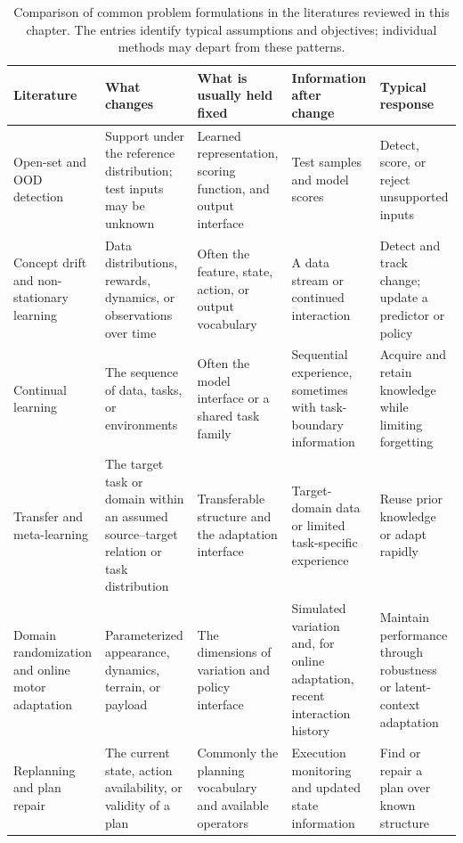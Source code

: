 \begin{table}[t]
\centering
\caption[Comparison of related problem formulations]{Comparison of common problem formulations in the literatures reviewed in this chapter. The entries identify typical assumptions and objectives; individual methods may depart from these patterns.}
\label{tab:landscape}
\scriptsize
\setlength{\tabcolsep}{3pt}
\renewcommand{\arraystretch}{1.22}
\begin{tabularx}{\textwidth}{>{\raggedright\arraybackslash}p{} *{4}{>{\raggedright\arraybackslash}X}}
\toprule
\textbf{Literature} & \textbf{What changes} & \textbf{What is usually held fixed} & \textbf{Information after change} & \textbf{Typical response} \\
\midrule
Open-set and OOD detection
& Support under the reference distribution; test inputs may be unknown
& Learned representation, scoring function, and output interface
& Test samples and model scores
& Detect, score, or reject unsupported inputs \\

Concept drift and non-stationary learning
& Data distributions, rewards, dynamics, or observations over time
& Often the feature, state, action, or output vocabulary
& A data stream or continued interaction
& Detect and track change; update a predictor or policy \\

Continual learning
& The sequence of data, tasks, or environments
& Often the model interface or a shared task family
& Sequential experience, sometimes with task-boundary information
& Acquire and retain knowledge while limiting forgetting \\

Transfer and meta-learning
& The target task or domain within an assumed source--target relation or task distribution
& Transferable structure and the adaptation interface
& Target-domain data or limited task-specific experience
& Reuse prior knowledge or adapt rapidly \\

Domain randomization and online motor adaptation
& Parameterized appearance, dynamics, terrain, or payload
& The dimensions of variation and policy interface
& Simulated variation and, for online adaptation, recent interaction history
& Maintain performance through robustness or latent-context adaptation \\

Replanning and plan repair
& The current state, action availability, or validity of a plan
& Commonly the planning vocabulary and available operators
& Execution monitoring and updated state information
& Find or repair a plan over known structure \\


\end{tabularx}
\end{table}
